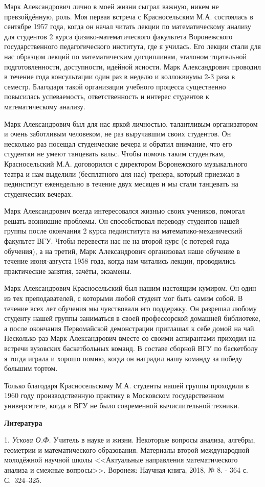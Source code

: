 Марк Александрович лично в моей жизни сыграл важную, никем не превзойдённую, роль. Моя первая встреча с Красносельским М.А.
состоялась в сентябре 1957 года, когда он начал читать лекции по математическому анализу для студентов 2 курса
физико-математического факультета Воронежского государственного педагогического института, где я училась. Его лекции стали для нас
образцом лекций по математическим дисциплинам, эталоном тщательной подготовленности, доступности, идейной ясности. Марк
Александрович проводил в течение года консультации один раз в неделю и коллоквиумы 2-3 раза в семестр. Благодаря такой
организации учебного процесса существенно повысилась успеваемость, ответственность и интерес студентов к
математическому анализу.

Марк Александрович был для нас яркой личностью, талантливым организатором и очень заботливым человеком, не раз выручавшим
своих студентов. Он несколько раз посещал студенческие вечера и обратил внимание, что его студентки не умеют танцевать
вальс. Чтобы помочь таким студенткам, Красносельский М.А. договорился с директором Воронежского музыкального театра и нам выделили
(бесплатного для нас) тренера, который приезжал в пединститут еженедельно в течение двух месяцев и мы стали танцевать на
студенческих вечерах.

Марк Александрович всегда интересовался жизнью своих учеников, помогал решать возникшие проблемы. Он способствовал
переводу студентов нашей группы после окончания 2 курса пединститута на математико-механический факультет ВГУ. Чтобы
перевести нас не на второй курс (с потерей года обучения), а на третий, Марк Александрович организовал наше обучение
в течение июня-августа 1958 года, когда нам читались лекции, проводились практические занятия, зачёты, экзамены.

Марк Александрович Красносельский был нашим настоящим кумиром. Он один из тех преподавателей, с которыми любой студент
мог быть самим собой. В течение всех лет обучения мы чувствовали его поддержку. Он разрешал любому студенту нашей
группы заниматься в своей профессорской домашней библиотеке, а после окончания Первомайской демонстрации приглашал
к себе домой на чай. Несколько раз Марк Александрович вместе со своими аспирантами приходил на встречи вузовских
баскетбольных команд. В составе сборной ВГУ по баскетболу я тогда играла и хорошо помню, когда он наградил нашу
команду за победу большим тортом.

Только благодаря Красносельскому М.А. студенты нашей группы проходили в 1960 году производственную практику в Московском
государственном университете, когда в ВГУ не было современной вычислительной техники.


\smallskip \centerline {\bf Литература} \nopagebreak

1. {\it Ускова О.Ф.} Учитель в науке и жизни. Некоторые вопросы анализа, алгебры, геометрии и математического образования.
Материалы второй международной молодёжной научной школы <<Актуальные направления математического анализа и смежные вопросы>>.
Воронеж: Научная книга, 2018, № 8. - 364 с. С.~324--325.

